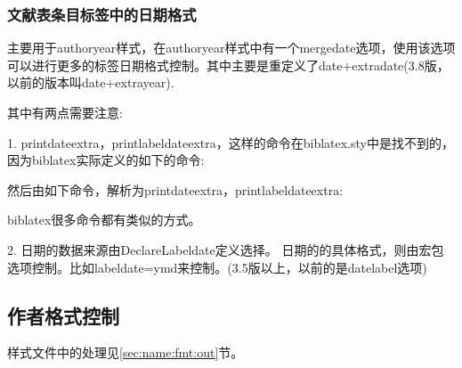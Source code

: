 \begin{texlist}
\iftoggle{iftlfive}%
    {\switchversion{3.4}{date}}%
    {\iftoggle{iftlsix}%
        {\switchversion{3.4}{date}}%
        {\switchversion{3.7}{date}}%
    }
\end{texlist}

\subsubsection{文献表条目标签中的日期格式}\label{sec:dateinlabel}
主要用于authoryear样式，在authoryear样式中有一个mergedate选项，使用该选项可以进行更多的标签日期格式控制。其中主要是重定义了date+extradate(3.8版，以前的版本叫date+extrayear).

其中有两点需要注意:

1. printdateextra，printlabeldateextra，这样的命令在biblatex.sty中是找不到的，因为biblatex实际定义的如下的命令:
\begin{texlist}
{\protected\def\blx@imc@printlabeldate{\csuse{mkdaterange#1}{label}}
        \protected\def\blx@imc@printlabeldateextra{\csuse{mkdaterange#1extra}{label}}}
\end{texlist}

然后由如下命令，解析为printdateextra，printlabeldateextra:
\begin{texlist}
\blx@regimcs{\printlabeldate \printlabeltime \printlabeldateextra \stripzeros \forcezerosy \forcezerosmdt \mkyearzeros \mkmonthzeros \mkdayzeros \mktimezeros}
\end{texlist}

biblatex很多命令都有类似的方式。

2. 日期的数据来源由DeclareLabeldate定义选择。
日期的的具体格式，则由宏包选项控制。比如labeldate=ymd来控制。(3.5版以上，以前的是datelabel选项)

\subsection{作者格式控制}\label{sec:name:fmt}

    样式文件中的处理见\ref{sec:name:fmt:out}节。

